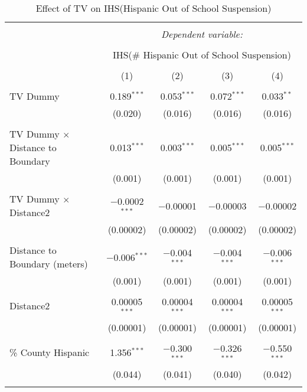 
\begin{table}[!htbp] \centering 
  \caption{Effect of TV on IHS(Hispanic Out of School Suspension)} 
  \label{} 
\begin{tabular}{@{\extracolsep{-2pt}}lcccc} 
\\[-1.8ex]\hline 
\hline \\[-1.8ex] 
 & \multicolumn{4}{c}{\textit{Dependent variable:}} \\ 
\cline{2-5} 
\\[-1.8ex] & \multicolumn{4}{c}{IHS(\# Hispanic Out of School Suspension)} \\ 
\\[-1.8ex] & (1) & (2) & (3) & (4)\\ 
\hline \\[-1.8ex] 
 TV Dummy & 0.189$^{***}$ & 0.053$^{***}$ & 0.072$^{***}$ & 0.033$^{**}$ \\ 
  & (0.020) & (0.016) & (0.016) & (0.016) \\ 
  & & & & \\ 
 TV Dummy $\times$ Distance to Boundary & 0.013$^{***}$ & 0.003$^{***}$ & 0.005$^{***}$ & 0.005$^{***}$ \\ 
  & (0.001) & (0.001) & (0.001) & (0.001) \\ 
  & & & & \\ 
 TV Dummy $\times$ Distance2 & $-$0.0002$^{***}$ & $-$0.00001 & $-$0.00003 & $-$0.00002 \\ 
  & (0.00002) & (0.00002) & (0.00002) & (0.00002) \\ 
  & & & & \\ 
 Distance to Boundary (meters) & $-$0.006$^{***}$ & $-$0.004$^{***}$ & $-$0.004$^{***}$ & $-$0.006$^{***}$ \\ 
  & (0.001) & (0.001) & (0.001) & (0.001) \\ 
  & & & & \\ 
 Distance2 & 0.00005$^{***}$ & 0.00004$^{***}$ & 0.00004$^{***}$ & 0.00005$^{***}$ \\ 
  & (0.00001) & (0.00001) & (0.00001) & (0.00001) \\ 
  & & & & \\ 
 \% County Hispanic & 1.356$^{***}$ & $-$0.300$^{***}$ & $-$0.326$^{***}$ & $-$0.550$^{***}$ \\ 
  & (0.044) & (0.041) & (0.040) & (0.042) \\ 
  & & & & \\ 

\end{tabular}
\end{table}
